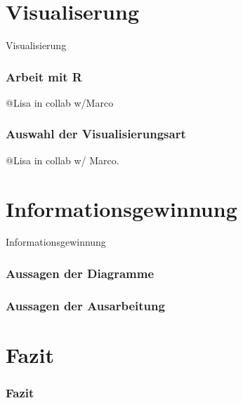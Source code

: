 \documentclass{beamer}
\begin{document}
\section{Visualiserung}
\begin{frame}
	\begin{center}
		{\Huge Visualisierung}
	\end{center}
\end{frame}

\begin{frame}
	\frametitle{Arbeit mit R}
	@Lisa in collab w/Marco
\end{frame}

\begin{frame}
	\frametitle{Auswahl der Visualisierungsart}
	@Lisa in collab w/ Marco.
\end{frame}

\section{Informationsgewinnung}
\begin{frame}
	\begin{center}
		{\Huge Informationsgewinnung}
	\end{center}
\end{frame}

\begin{frame}
	\frametitle{Aussagen der Diagramme}
\end{frame}

\begin{frame}
	\frametitle{Aussagen der Ausarbeitung}
\end{frame}

\section{Fazit}
\begin{frame}
	\frametitle{Fazit}
\end{frame}

\end{document}
